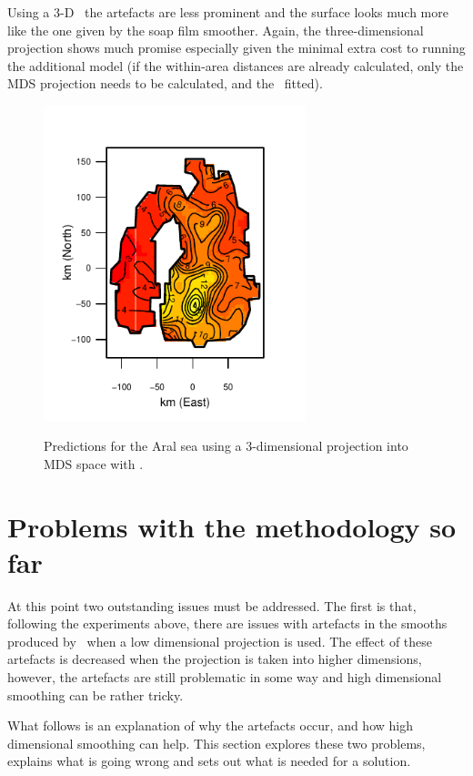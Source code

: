 Using a 3-D \tprs\ the artefacts are less prominent and the surface looks much more like the one given by the soap film smoother. Again, the three-dimensional projection shows much promise especially given the minimal extra cost to running the additional model (if the within-area distances are already calculated, only the MDS projection needs to be calculated, and the \tprs\ fitted).

\begin{figure}
\centering
\includegraphics[width=3in]{mds/figs/aral-3d.pdf} \\
\caption{Predictions for the Aral sea using a 3-dimensional projection into MDS space with \mdsap.}
\label{aral-fit-3d}
\end{figure}

\section{Problems with the methodology so far}
\label{mds-problems}

At this point two outstanding issues must be addressed. The first is that, following the experiments above, there are issues with artefacts in the smooths produced by \mdsap\ when a low dimensional projection is used. The effect of these artefacts is decreased when the projection is taken into higher dimensions, however, the artefacts are still problematic in some way and high dimensional smoothing can be rather tricky. 

What follows is an explanation of why the artefacts occur, and how high dimensional smoothing can help. This section explores these two problems, explains what is going wrong and sets out what is needed for a solution.

